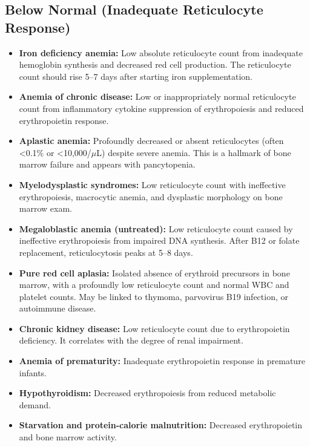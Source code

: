 \subsection*{Below Normal (Inadequate Reticulocyte Response)}
\begin{itemize}
  \item \textbf{Iron deficiency anemia:} Low absolute reticulocyte count from inadequate hemoglobin synthesis and decreased red cell production. The reticulocyte count should rise 5--7 days after starting iron supplementation.
  \item \textbf{Anemia of chronic disease:} Low or inappropriately normal reticulocyte count from inflammatory cytokine suppression of erythropoiesis and reduced erythropoietin response.
  \item \textbf{Aplastic anemia:} Profoundly decreased or absent reticulocytes (often <0.1\% or <10,000/$\mu$L) despite severe anemia. This is a hallmark of bone marrow failure and appears with pancytopenia.
  \item \textbf{Myelodysplastic syndromes:} Low reticulocyte count with ineffective erythropoiesis, macrocytic anemia, and dysplastic morphology on bone marrow exam.
  \item \textbf{Megaloblastic anemia (untreated):} Low reticulocyte count caused by ineffective erythropoiesis from impaired DNA synthesis. After B12 or folate replacement, reticulocytosis peaks at 5--8 days.
  \item \textbf{Pure red cell aplasia:} Isolated absence of erythroid precursors in bone marrow, with a profoundly low reticulocyte count and normal WBC and platelet counts. May be linked to thymoma, parvovirus B19 infection, or autoimmune disease.
  \item \textbf{Chronic kidney disease:} Low reticulocyte count due to erythropoietin deficiency. It correlates with the degree of renal impairment.
  \item \textbf{Anemia of prematurity:} Inadequate erythropoietin response in premature infants.
  \item \textbf{Hypothyroidism:} Decreased erythropoiesis from reduced metabolic demand.
  \item \textbf{Starvation and protein-calorie malnutrition:} Decreased erythropoietin and bone marrow activity.
\end{itemize}

